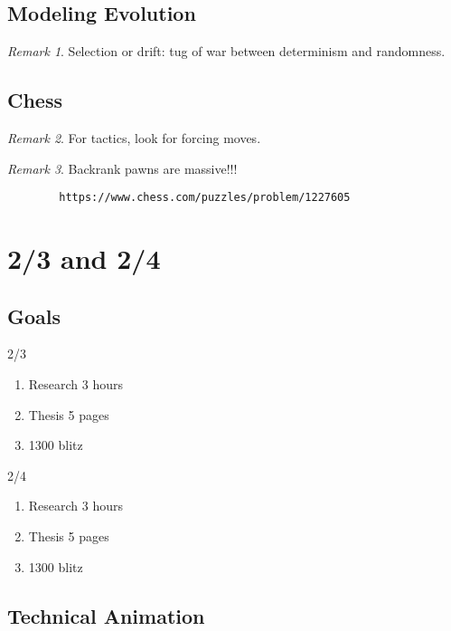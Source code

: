 \documentclass[11pt]{article}
\theoremstyle{remark}
\newtheorem{remark}{Remark}
\begin{document}
\subsection{Modeling Evolution}

\begin{remark}
	Selection or drift: tug of war between determinism and randomness.
\end{remark}

\subsection{Chess}

\begin{remark}
	For tactics, look for forcing moves.
\end{remark}

\begin{remark}
	Backrank pawns are massive!!! 
	\begin{verbatim}
		https://www.chess.com/puzzles/problem/1227605
	\end{verbatim}
\end{remark}



\section{2/3 and 2/4}

\subsection{Goals}

2/3

\begin{enumerate}
	\item Research 3 hours
	\item Thesis 5 pages
	\item 1300 blitz
\end{enumerate}

2/4

\begin{enumerate}
	\item Research 3 hours
	\item Thesis 5 pages
	\item 1300 blitz
\end{enumerate}

\subsection{Technical Animation}
\end{document}
